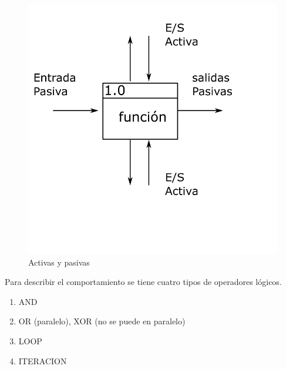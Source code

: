 \begin{figure}[h!]
    \centering
        \includegraphics[scale=0.05]{Proyecto Integrador Figuras/17 Activas_Pasivas.png}
        \caption{Activas y pasivas}
\end{figure}

Para describir el comportamiento se tiene cuatro tipos de operadores lógicos.

\begin{enumerate}
    \item AND
    \item OR (paralelo), XOR (no se puede en paralelo)
    \item LOOP
    \item ITERACION
\end{enumerate}


